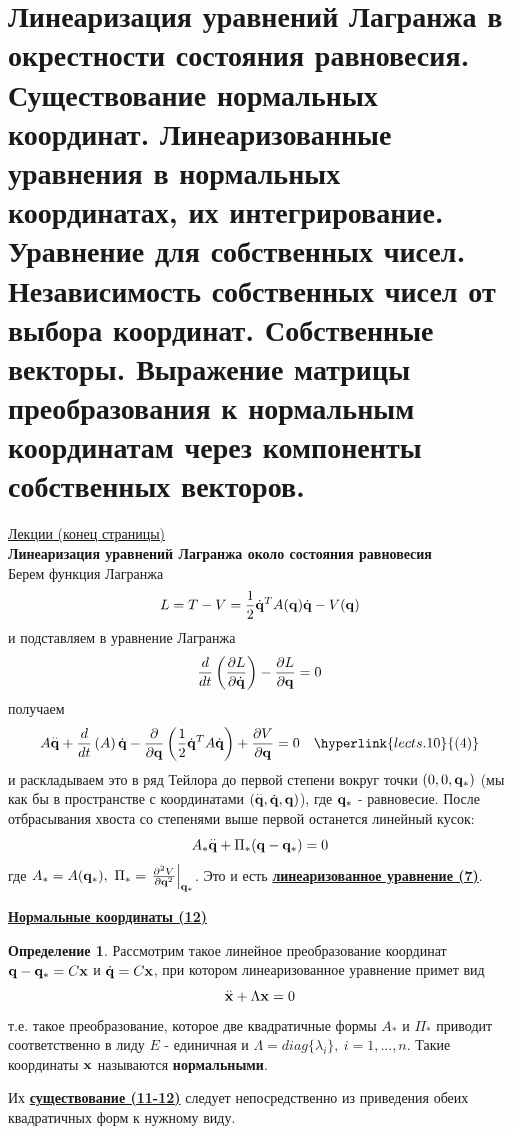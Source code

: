\documentclass[specialist, subf, href, colorlinks=true, 12pt, times, mtpro, final]{disser}
\theoremstyle{definition}
\newtheorem{defn}{Определение}[section]
\begin{document}
    \section{Линеаризация уравнений Лагранжа в окрестности состояния равновесия. Существование нормальных координат. Линеаризованные уравнения в нормальных координатах, их интегрирование. Уравнение для собственных чисел. Независимость собственных чисел от выбора координат. Собственные векторы. Выражение матрицы преобразования к нормальным координатам через компоненты собственных векторов.}
     \label{12}
    \hyperlink {lects.11}{Лекции (конец страницы)} \\
    
    \textbf{Линеаризация уравнений Лагранжа около состояния равновесия} \\
    Берем функция Лагранжа
    $$
   		L = T - V = \frac{1}{2}\dot{\mathbf{q}}^T A(\mathbf{q}) \dot{\mathbf{q}} - V(\mathbf{q})
    $$
    и подставляем в уравнение Лагранжа
    $$
    	\frac{d}{dt}\left( \frac{\partial L}{\partial \dot{\mathbf{q}}} \right) - \frac{\partial L}{\partial\mathbf{q}} = 0
    $$
    получаем 
    $$
    	A \overset{..}{\bfq} + \frac{d}{dt}\left( A \right) \dot{\bfq} - \frac{\partial}{\partial \bfq} \left(\frac{1}{2} \dot{\bfq}^T A \dot{\bfq} \right) + \frac{\partial V}{\partial \bfq} = 0 \ \ \ \hyperlink {lects.10}{(4)}
    $$
    и раскладываем это в ряд Тейлора до первой степени вокруг точки $(0,0,\mathbf{q}_*)$ (мы как бы в пространстве с координатами $(\overset{..}{\mathbf{q}}, \dot{\mathbf{q}}, \mathbf{q})$), где $\mathbf{q}_*$ - равновесие. После отбрасывания хвоста со степенями выше первой останется линейный кусок:
    $$
    	A_* \overset{..}{\mathbf{q}} + \Pi_* (\mathbf{q} - \mathbf{q}_*) = 0
    $$
    где $A_* = A(\mathbf{q}_*), \ \Pi_* = \left. \frac{\partial^2 V}{\partial \mathbf{q}^2} \right|_{\mathbf{q}_*}$. Это и есть \textbf{\hyperlink{lects.12}{линеаризованное уравнение (7)}}.
    
    \bigskip  
    \textbf{\hyperlink{lects.12}{Нормальные координаты (12)}}
    \begin{defn}
    	Рассмотрим такое линейное преобразование координат $\mathbf{q} - \mathbf{q}_* = C\mathbf{x}$ и $\dot{\mathbf{q}} = C\mathbf{x}$, при котором линеаризованное уравнение примет вид
    	$$
    		\overset{..}{\mathbf{x}} + \Lambda \mathbf{x} = 0
    	$$ 
    	т.е. такое преобразование, которое две квадратичные формы $A_*$ и $\Pi_*$ приводит соответственно в лиду $E$ - единичная и $\Lambda = diag\{\lambda_i\}, \ i = 1,...,n$. Такие координаты $\mathbf{x}$ называются \textbf{нормальными}.
    \end{defn}  
	Их \textbf{\hyperlink{lects.12}{существование (11-12)}} следует непосредственно из приведения обеих квадратичных форм к нужному виду.
	
\end{document}
